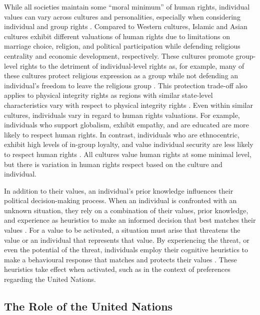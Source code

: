 \documentclass[12pt]{article}
\newcommand{\UN}[1]{United Nations}
\begin{document}
While all societies maintain some ``moral minimum'' of human rights, individual values can vary across cultures and personalities, especially when considering individual and group rights \citep{conrad2018torture}. Compared to Western cultures, Islamic and Asian cultures exhibit different valuations of human rights due to limitations on marriage choice, religion, and political participation while defending religious centrality and economic development, respectively. These cultures promote group-level rights to the detriment of individual-level rights as, for example, many of these cultures protect religious expression as a group while not defending an individual's freedom to leave the religious group \citep{ignatieff2000human}. This protection trade-off also applies to physical integrity rights as regions with similar state-level characteristics vary with respect to physical integrity rights \citep{richards2015respect}. Even within similar cultures, individuals vary in regard to human rights valuations. For example, individuals who support globalism, exhibit empathy, and are educated are more likely to respect human rights. In contrast, individuals who are ethnocentric, exhibit high levels of in-group loyalty, and value individual security are less likely to respect human rights \citep{mcfarland2010personality}. All cultures value human rights at some minimal level, but there is variation in human rights respect based on the culture and individual. 

In addition to their values, an individual's prior knowledge influences their political decision-making process. When an individual is confronted with an unknown situation, they rely on a combination of their values, prior knowledge, and experience as heuristics to make an informed decision that best matches their values \citep{conover1988role,baldwin1992relational,cantor1982prototype}. For a value to be activated, a situation must arise that threatens the value or an individual that represents that value. By experiencing the threat, or even the potential of the threat, individuals employ their cognitive heuristics to make a behavioural response that matches and protects their values \citep{jardina2019white}. These heuristics take effect when activated, such as in the context of preferences regarding the \UN{}. 

\subsection*{The Role of the United Nations}
\end{document}
